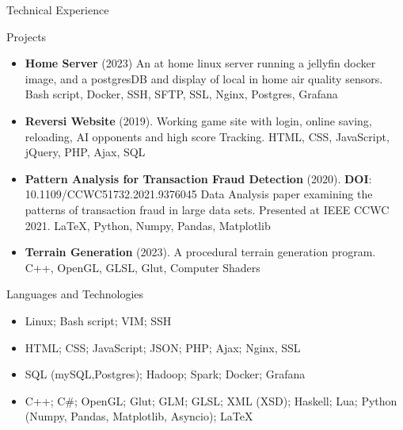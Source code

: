 \documentclass[]{mcdowellcvcustom}
\begin{document}
	\vspace{10mm}
	
	\begin{cvsection}{Technical Experience}
		\begin{cvsubsection}{Projects}{}{}
			\begin{itemize}
				\item \textbf{Home Server} (2023) An at home linux server running a jellyfin docker image, and a postgresDB and display of local in home air quality sensors. Bash script, Docker, SSH, SFTP, SSL, Nginx, Postgres, Grafana
				\item \textbf{Reversi Website} (2019). Working game site with login, online saving, reloading, AI opponents and high score Tracking.  HTML, CSS, JavaScript, jQuery, PHP, Ajax, SQL
				\item \textbf{Pattern Analysis for Transaction Fraud Detection} (2020). \textbf{DOI}: 10.1109/CCWC51732.2021.9376045 Data Analysis paper examining the patterns of transaction fraud in large data sets. Presented at IEEE CCWC 2021. \LaTeX, Python, Numpy, Pandas, Matplotlib
				\item \textbf{Terrain Generation} (2023). A procedural terrain generation program.  C++, OpenGL, GLSL, Glut, Computer Shaders
				
			\end{itemize}
		\end{cvsubsection}
	\end{cvsection}
	
	\vspace{10mm}

	\begin{cvsection}{Languages and Technologies}
		\begin{cvsubsection}{}{}{}	
			\begin{itemize}
				\item Linux; Bash script; VIM; SSH
				\item HTML; CSS; JavaScript; JSON; PHP; Ajax; Nginx, SSL
				\item SQL (mySQL,Postgres); Hadoop; Spark; Docker; Grafana
				\item C++; C\#; OpenGL; Glut; GLM; GLSL; XML (XSD); Haskell; Lua; Python (Numpy, Pandas, Matplotlib, Asyncio); \LaTeX  
			\end{itemize}
		\end{cvsubsection}
	\end{cvsection}
	
\end{document}
